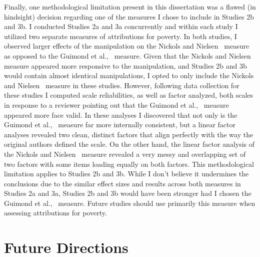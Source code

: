 \documentclass{sfuthesis}
\begin{document}
Finally, one methodological limitation present in this dissertation was a flawed (in hindsight) decision regarding one of the measures I chose to include in Studies 2b and 3b. I conducted Studies 2a and 3a concurrently and within each study I utilized two separate measures of attributions for poverty. In both studies, I observed larger effects of the manipulation on the Nickols and Nielsen~\cite{nickols11} measure as opposed to the Guimond et al.,~\cite{guimond89} measure. Given that the Nickols and Nielsen~\cite{nickols11} measure appeared more responsive to the manipulation, and Studies 2b and 3b would contain almost identical manipulations, I opted to only include the Nickols and Nielsen~\cite{nickols11} measure in these studies. However, following data collection for these studies I computed scale reliabilities, as well as factor analyzed, both scales in response to a reviewer pointing out that the Guimond et al.,~\cite{guimond89} measure appeared more face valid. In these analyses I discovered that not only is the Guimond et al.,~\cite{guimond89} measure far more internally consistent, but a linear factor analyses revealed two clean, distinct factors that align perfectly with the way the original authors defined the scale. On the other hand, the linear factor analysis of the Nickols and Nielsen~\cite{nickols11} measure revealed a very messy and overlapping set of two factors with some items loading equally on both factors. This methodological limitation applies to Studies 2b and 3b. While I don’t believe it undermines the conclusions due to the similar effect sizes and results across both measures in Studies 2a and 3a, Studies 2b and 3b would have been stronger had I chosen the Guimond et al.,~\cite{nickols11} measure. Future studies should use primarily this measure when assessing attributions for poverty.

\section{Future Directions}
\end{document}
